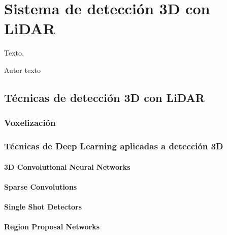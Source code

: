 \chapter{Sistema de detección 3D con LiDAR}
\label{cha:Sistema de detección 3D con LiDAR}

\begin{FraseCelebre}
  \begin{Frase}
    Texto.
  \end{Frase}
  \begin{Fuente}
    Autor texto
  \end{Fuente}
\end{FraseCelebre}

\section{Técnicas de detección 3D con LiDAR}
\label{sec:Técnicas de detección 3D con LiDAR}

\subsection{Voxelización}
\label{sec:Voxelización}

\subsection{Técnicas de Deep Learning aplicadas a detección 3D}
\label{sec:Técnicas de Deep Learning aplicadas a detección 3D}

\subsubsection{3D Convolutional Neural Networks}
\label{sec:3D Convolutional Neural Networks}

\subsubsection{Sparse Convolutions}
\label{sec:Sparse Convolutions}

\subsubsection{Single Shot Detectors}
\label{sec:Single Shot Detectors}

\subsubsection{Region Proposal Networks}
\label{sec:Region Proposal Networks}

